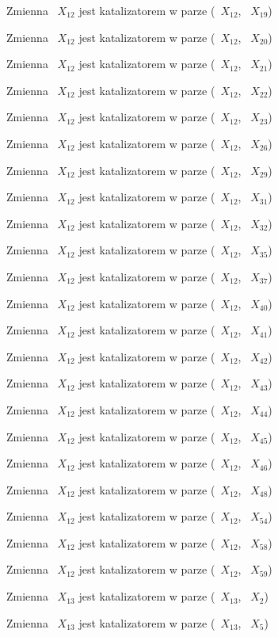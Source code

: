 \documentclass{article}
\begin{document}
Zmienna ~$X_{12}$ jest katalizatorem w parze (~$X_{12}$, ~$X_{19}$)

Zmienna ~$X_{12}$ jest katalizatorem w parze (~$X_{12}$, ~$X_{20}$)

Zmienna ~$X_{12}$ jest katalizatorem w parze (~$X_{12}$, ~$X_{21}$)

Zmienna ~$X_{12}$ jest katalizatorem w parze (~$X_{12}$, ~$X_{22}$)

Zmienna ~$X_{12}$ jest katalizatorem w parze (~$X_{12}$, ~$X_{23}$)

Zmienna ~$X_{12}$ jest katalizatorem w parze (~$X_{12}$, ~$X_{26}$)

Zmienna ~$X_{12}$ jest katalizatorem w parze (~$X_{12}$, ~$X_{29}$)

Zmienna ~$X_{12}$ jest katalizatorem w parze (~$X_{12}$, ~$X_{31}$)

Zmienna ~$X_{12}$ jest katalizatorem w parze (~$X_{12}$, ~$X_{32}$)

Zmienna ~$X_{12}$ jest katalizatorem w parze (~$X_{12}$, ~$X_{35}$)

Zmienna ~$X_{12}$ jest katalizatorem w parze (~$X_{12}$, ~$X_{37}$)

Zmienna ~$X_{12}$ jest katalizatorem w parze (~$X_{12}$, ~$X_{40}$)

Zmienna ~$X_{12}$ jest katalizatorem w parze (~$X_{12}$, ~$X_{41}$)

Zmienna ~$X_{12}$ jest katalizatorem w parze (~$X_{12}$, ~$X_{42}$)

Zmienna ~$X_{12}$ jest katalizatorem w parze (~$X_{12}$, ~$X_{43}$)

Zmienna ~$X_{12}$ jest katalizatorem w parze (~$X_{12}$, ~$X_{44}$)

Zmienna ~$X_{12}$ jest katalizatorem w parze (~$X_{12}$, ~$X_{45}$)

Zmienna ~$X_{12}$ jest katalizatorem w parze (~$X_{12}$, ~$X_{46}$)

Zmienna ~$X_{12}$ jest katalizatorem w parze (~$X_{12}$, ~$X_{48}$)

Zmienna ~$X_{12}$ jest katalizatorem w parze (~$X_{12}$, ~$X_{54}$)

Zmienna ~$X_{12}$ jest katalizatorem w parze (~$X_{12}$, ~$X_{58}$)

Zmienna ~$X_{12}$ jest katalizatorem w parze (~$X_{12}$, ~$X_{59}$)

Zmienna ~$X_{13}$ jest katalizatorem w parze (~$X_{13}$, ~$X_{2}$)

Zmienna ~$X_{13}$ jest katalizatorem w parze (~$X_{13}$, ~$X_{5}$)
\end{document}
